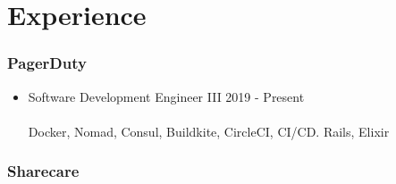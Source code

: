 \newcommand{\headerrow}[3] {
\item[] #1 \hfill #3}
%
\newenvironment{position}{
  \begin{itemize}[leftmargin=*]
    \setlength{\itemsep}{1pt}
    \setlength{\parskip}{0pt}
    \setlength{\parsep}{0pt}
}{\end{itemize}}

\section{Experience}

\subsubsection{PagerDuty}
\begin{position}
  \headerrow{Software Development Engineer III}{PagerDuty.}{2019 - Present}
  \paragraph{} Docker, Nomad, Consul, Buildkite, CircleCI, CI/CD. Rails, Elixir
\end{position}

\subsubsection{Sharecare}

